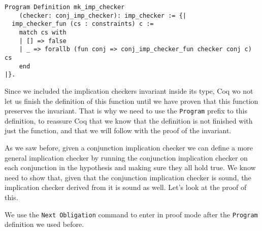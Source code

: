 \begin{verbatim}
Program Definition mk_imp_checker 
    (checker: conj_imp_checker): imp_checker := {|
  imp_checker_fun (cs : constraints) c := 
    match cs with
    | [] => false
    | _ => forallb (fun conj => conj_imp_checker_fun checker conj c) cs
    end
|}.
\end{verbatim}

Since we included the implication checkers invariant inside its type, Coq wo not let us finish the definition
of this function until we have proven that this function preserves the invariant. That is why we need to use
the \texttt{Program} prefix to this definition, to reassure Coq that we know that the definition is not finished 
with just the function, and that we will follow with the proof of the invariant.

As we saw before, given a conjunction implication checker we can define a more general implication checker
by running the conjunction implication checker on each conjunction in the hypothesis and making sure they 
all hold true. We know need to show that, given that the conjunction implication checker is sound, the
implication checker derived from it is sound as well. Let's look at the proof of this.

We use the \texttt{Next Obligation} command to enter in proof mode after the \texttt{Program} definition we used before.

